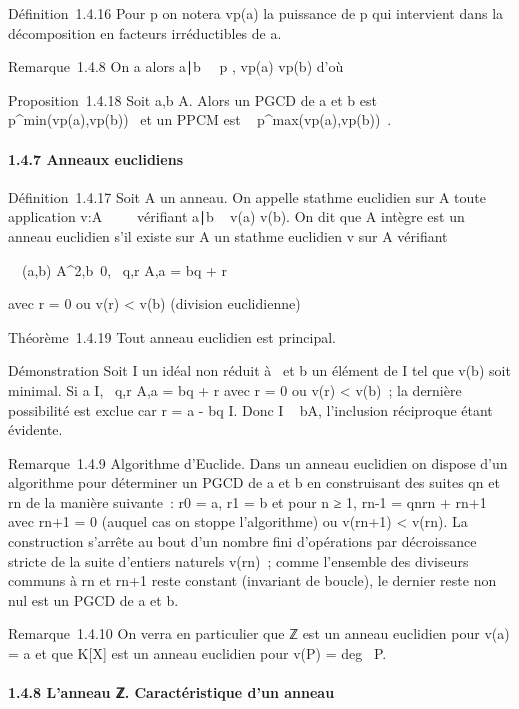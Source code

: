 Définition~1.4.16 Pour p \inP on notera vp(a) la puissance de p
qui intervient dans la décomposition en facteurs irréductibles de a.

Remarque~1.4.8 On a alors a∣b
\Leftrightarrow \forall~~p \inP,
vp(a) \leq vp(b) d'où

Proposition~1.4.18 Soit a,b \in A. Alors un PGCD de a et b est
\∏ ~
p\inPp^min(vp(a),vp(b))~
et un PPCM est \∏ ~
p\inPp^max(vp(a),vp(b))~.

\paragraph{1.4.7 Anneaux euclidiens}

Définition~1.4.17 Soit A un anneau. On appelle stathme euclidien sur A
toute application v:A \diagdown\0\ \rightarrow~ ~
vérifiant a∣b \rigtharrow~ v(a) \leq v(b). On dit que A
intègre est un anneau euclidien s'il existe sur A un stathme euclidien v
sur A vérifiant

\forall~~(a,b) \in
A^2,b\neq~0,
\exists~q,r \in A,\quad a = bq + r

avec r = 0 ou v(r) \textless{} v(b) (division euclidienne)

Théorème~1.4.19 Tout anneau euclidien est principal.

Démonstration Soit I un idéal non réduit à
\0\ et b un élément de I tel que v(b)
soit minimal. Si a \in I, \exists~q,r \in
A,\quad a = bq + r avec r = 0 ou v(r) \textless{} v(b)~;
la dernière possibilité est exclue car r = a - bq \in I. Donc I \subset~ bA,
l'inclusion réciproque étant évidente.

Remarque~1.4.9 Algorithme d'Euclide. Dans un anneau euclidien on dispose
d'un algorithme pour déterminer un PGCD de a et b en construisant des
suites qn et rn de la manière suivante~:
r0 = a, r1 = b et pour n ≥ 1, rn-1 =
qnrn + rn+1 avec rn+1 = 0
(auquel cas on stoppe l'algorithme) ou v(rn+1) \textless{}
v(rn). La construction s'arrête au bout d'un nombre fini
d'opérations par décroissance stricte de la suite d'entiers naturels
v(rn)~; comme l'ensemble des diviseurs communs à rn
et rn+1 reste constant (invariant de boucle), le dernier reste
non nul est un PGCD de a et b.

Remarque~1.4.10 On verra en particulier que ℤ est un anneau euclidien
pour v(a) = \textbar{}a\textbar{} et que K{[}X{]} est un anneau
euclidien pour v(P) = deg~ P.

\paragraph{1.4.8 L'anneau ℤ. Caractéristique d'un anneau}

